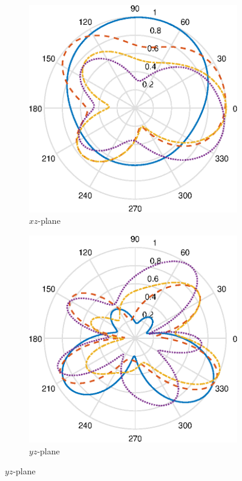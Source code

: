 \begin{figure}[H]
\begin{subfigure}[b]{0.3\textwidth}
        \includegraphics[width=\textwidth]{img/ff_cell_xz.eps}
        \caption{$xz$-plane}
        \label{fig:ff_xz_cell}
    \end{subfigure}
    \begin{subfigure}[b]{0.3\textwidth}
        \includegraphics[width=\textwidth]{img/ff_cell_yz.eps}
        \caption{$yz$-plane}
        \label{fig:ff_yz_cell}
    \end{subfigure}
    

\end{figure}
